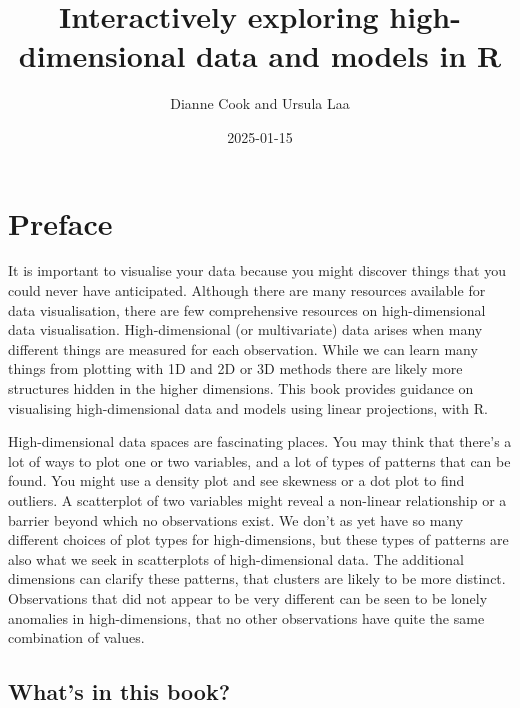 \documentclass[
  letterpaper,
]{krantz}
\title{Interactively exploring high-dimensional data and models in R}
\author{Dianne Cook and Ursula Laa}
\date{2025-01-15}
\renewcommand*\contentsname{Table of contents}
\newcommand\contentsname{Table of contents}
\begin{document}
\maketitle

\renewcommand*\contentsname{Contents}
{
\hypersetup{linkcolor=}
\setcounter{tocdepth}{1}
\tableofcontents
}


\chapter*{Preface}\label{preface}


It is important to visualise your data because you might discover things
that you could never have anticipated. Although there are many resources
available for data visualisation, there are few comprehensive resources
on high-dimensional data visualisation. High-dimensional (or
multivariate) data arises when many different things are measured for
each observation. While we can learn many things from plotting with 1D
and 2D or 3D methods there are likely more structures hidden in the
higher dimensions. This book provides guidance on visualising
high-dimensional data and models using linear projections, with R.

High-dimensional data spaces are fascinating places. You may think that
there's a lot of ways to plot one or two variables, and a lot of types
of patterns that can be found. You might use a density plot and see
skewness or a dot plot to find outliers. A scatterplot of two variables
might reveal a non-linear relationship or a barrier beyond which no
observations exist. We don't as yet have so many different choices of
plot types for high-dimensions, but these types of patterns are also
what we seek in scatterplots of high-dimensional data. The additional
dimensions can clarify these patterns, that clusters are likely to be
more distinct. Observations that did not appear to be very different can
be seen to be lonely anomalies in high-dimensions, that no other
observations have quite the same combination of values.

\section*{What's in this book?}\label{whats-in-this-book}

\end{document}
